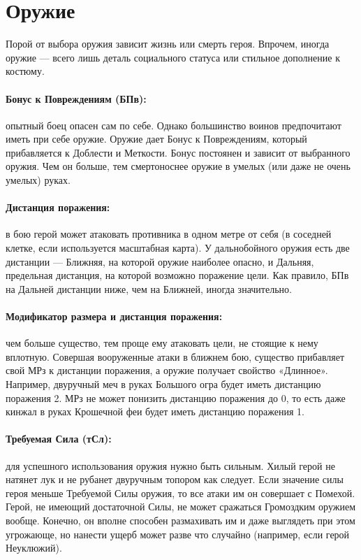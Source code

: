\section{Оружие}
Порой от выбора оружия зависит жизнь или смерть героя. Впрочем, иногда оружие — всего лишь деталь социального статуса или стильное дополнение к костюму.
\paragraph{Бонус к Повреждениям (БПв):} опытный боец опасен сам по себе. Однако большинство воинов предпочитают иметь при себе оружие. Оружие дает Бонус к Повреждениям, который прибавляется к Доблести и Меткости. Бонус постоянен и зависит от выбранного оружия. Чем он больше, тем смертоноснее оружие в умелых (или даже не очень умелых) руках.
\paragraph{Дистанция поражения:} в бою герой может атаковать противника в одном метре от себя (в соседней клетке, если используется масштабная карта). У дальнобойного оружия есть две дистанции — Ближняя, на которой оружие наиболее опасно, и Дальняя, предельная дистанция, на которой возможно поражение цели. Как правило, БПв на Дальней дистанции ниже, чем на Ближней, иногда значительно.
\paragraph{Модификатор размера и дистанция поражения:} чем больше существо, тем проще ему атаковать цели, не стоящие к нему вплотную. Совершая вооруженные атаки в ближнем бою, существо прибавляет свой МРз к дистанции поражения, а оружие получает свойство «Длинное». Например, двуручный меч в руках Большого огра будет иметь дистанцию поражения 2. МРз не может понизить дистанцию поражения до 0, то есть даже кинжал в руках Крошечной феи будет иметь дистанцию поражения 1.
\paragraph{Требуемая Сила (тСл):} для успешного использования оружия нужно быть сильным. Хилый герой не натянет лук и не рубанет двуручным топором как следует. 
\newline
Если значение силы героя меньше Требуемой Силы оружия, то все атаки им он совершает с Помехой. Герой, не имеющий достаточной Силы, не может сражаться Громоздким оружием вообще. Конечно, он вполне способен размахивать им и даже выглядеть при этом угрожающе, но нанести ущерб может разве что случайно (например, если герой Неуклюжий).
